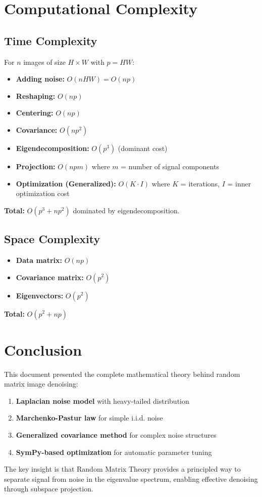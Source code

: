 \documentclass[12pt,a4paper]{article}
\begin{document}
\section{Computational Complexity}

\subsection{Time Complexity}

For $n$ images of size $H \times W$ with $p = HW$:

\begin{itemize}
    \item \textbf{Adding noise:} $O(nHW) = O(np)$
    \item \textbf{Reshaping:} $O(np)$
    \item \textbf{Centering:} $O(np)$
    \item \textbf{Covariance:} $O(np^2)$
    \item \textbf{Eigendecomposition:} $O(p^3)$ (dominant cost)
    \item \textbf{Projection:} $O(npm)$ where $m$ = number of signal components
    \item \textbf{Optimization (Generalized):} $O(K \cdot I)$ where $K$ = iterations, $I$ = inner optimization cost
\end{itemize}

\textbf{Total:} $O(p^3 + np^2)$ dominated by eigendecomposition.

\subsection{Space Complexity}

\begin{itemize}
    \item \textbf{Data matrix:} $O(np)$
    \item \textbf{Covariance matrix:} $O(p^2)$
    \item \textbf{Eigenvectors:} $O(p^2)$
\end{itemize}

\textbf{Total:} $O(p^2 + np)$

\section{Conclusion}

This document presented the complete mathematical theory behind random matrix image denoising:

\begin{enumerate}
    \item \textbf{Laplacian noise model} with heavy-tailed distribution
    \item \textbf{Marchenko-Pastur law} for simple i.i.d. noise
    \item \textbf{Generalized covariance method} for complex noise structures
    \item \textbf{SymPy-based optimization} for automatic parameter tuning
\end{enumerate}

The key insight is that Random Matrix Theory provides a principled way to separate signal from noise in the eigenvalue spectrum, enabling effective denoising through subspace projection.
\end{document}
